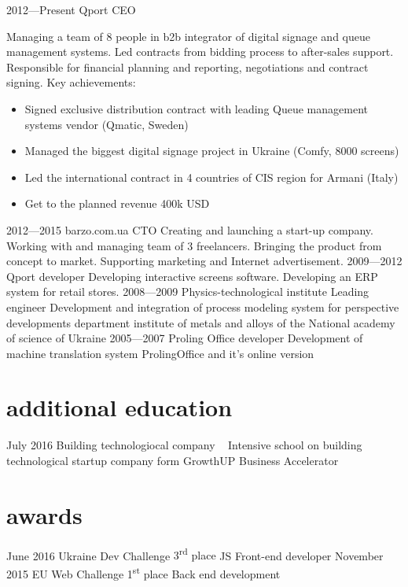 \documentclass[hidelinks,a4paper]{cv}
\begin{document}
\begin{entrylist}
  \entry
    {2012—Present}
    {Qport}
    {CEO}
    {
    Managing a team of 8 people in b2b integrator of digital signage and queue management systems. Led contracts from bidding process to after-sales support. Responsible for financial planning and reporting, negotiations and contract signing. Key achievements:
    \begin{itemize}
      \item Signed exclusive distribution contract with leading Queue management systems vendor (Qmatic, Sweden)
      \item Managed the biggest digital signage project in Ukraine  (Comfy, 8000 screens)
      \item Led the international contract in 4 countries of CIS region for Armani (Italy)
      \item Get to the planned revenue 400k USD
    \end{itemize}
    }
  \entry
    {2012—2015}
    {barzo.com.ua}
    {CTO}
    {Creating and launching a start-up company. Working with and managing team of 3 freelancers. Bringing the product from concept to market. Supporting marketing and Internet advertisement.
    }
  \entry
    {2009—2012}
    {Qport}
    {developer}
    {
    Developing interactive screens software. Developing an ERP system for retail stores.
    }
  \entry
    {2008—2009} 
    {Physics-technological institute}
    {Leading engineer}
    {Development and integration of process modeling system for perspective developments department institute of metals and alloys of the National academy of science of Ukraine}
  \entry
    {2005—2007}
    {Proling Office}
    {developer}
    {Development of machine translation system ProlingOffice and it's online version}
\end{entrylist}

\section{additional education}
\begin{entrylist}
  \entry
   {July 2016}
   {Building technologiocal company}
   {~}
   {Intensive school on building technological startup company form
   GrowthUP Business Accelerator}
\end{entrylist}

\newpage{}

\section{awards}
\begin{entrylist}
  \entry
   {June 2016}
   {Ukraine Dev Challenge}
   {3\textsuperscript{rd} place}
   {JS Front-end developer}
  \entry  
   {November 2015}
   {EU Web Challenge}
   {1\textsuperscript{st} place}
   {Back end development}
\end{entrylist}
\end{document}
